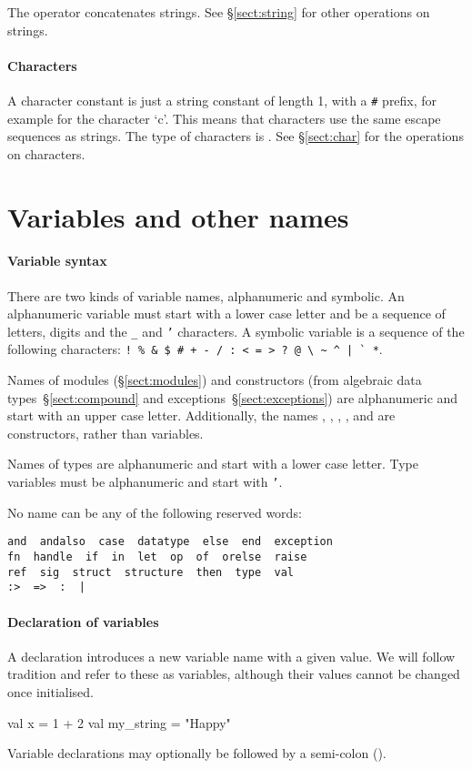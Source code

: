 \documentclass[12pt,a4paper]{book}
\begin{document}
The \smlinline{^} operator concatenates strings. See \S\ref{sect:string} for
other operations on strings.

\paragraph{Characters} A character constant is just a string constant of length
1, with a \texttt{\#} prefix, for example  for the character `c'.
This means that characters use the same escape sequences as strings. The type
of characters is . See \S\ref{sect:char} for the operations on characters.

\section{Variables and other names}
\label{sect:variables}

\paragraph{Variable syntax} There are two kinds of variable names, alphanumeric and symbolic. An alphanumeric variable must start
with a lower case letter and be a sequence of letters, digits and the \texttt{\_} and \texttt{'} characters. A symbolic variable is a sequence of the following characters: \verb)! % & $ # + - / : < = > ? @ \ ~ ^ | ` *).

Names of modules (\S\ref{sect:modules}) and constructors (from algebraic data types~\S\ref{sect:compound} and exceptions~\S\ref{sect:exceptions}) are alphanumeric and
start with an upper case letter. Additionally, the names ,
, , \smlinline{::}, and  are
constructors, rather than variables.

Names of types are alphanumeric and start
with a lower case letter.
%
Type variables must be alphanumeric and start with \texttt{'}.

No name can be any of the following reserved words:
\begin{verbatim}
and  andalso  case  datatype  else  end  exception
fn  handle  if  in  let  op  of  orelse  raise
ref  sig  struct  structure  then  type  val
:>  =>  :  |
\end{verbatim} 

\paragraph{Declaration of variables} A  declaration introduces a new variable name with a given value.
We will follow tradition and refer to these as variables, although their values
cannot be changed once initialised.
\begin{smlcode}
val x = 1 + 2
val my_string = "Happy"
\end{smlcode}
Variable declarations may optionally be followed by a semi-colon (\smlinline{;}).
\end{document}
